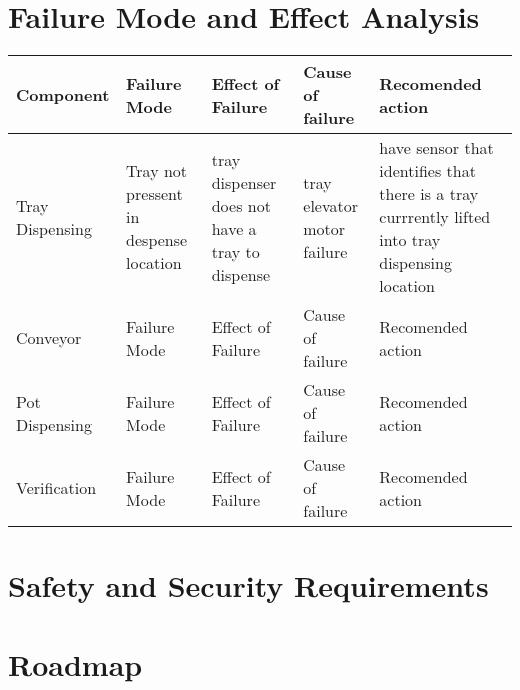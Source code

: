 \documentclass{article}
\begin{document}
\section{Failure Mode and Effect Analysis}

\begin{center}
    \begin{tabular}{ | l |  p{3cm}  p{3cm}  p{3cm}  p{3cm} |}
    \hline
    Component & Failure Mode & Effect of Failure & Cause of failure & Recomended action \\
    \hline
    Tray Dispensing & Tray not pressent in despense location & tray dispenser does not have a tray to dispense & tray elevator motor failure & have sensor that identifies that there is a tray currrently lifted into tray dispensing location \\
    \hline
    Conveyor & Failure Mode & Effect of Failure & Cause of failure & Recomended action \\
    \hline
    Pot Dispensing & Failure Mode & Effect of Failure & Cause of failure & Recomended action  \\
    \hline
    Verification & Failure Mode & Effect of Failure & Cause of failure & Recomended action  \\
    \hline
    \end{tabular}
\end{center}


\section{Safety and Security Requirements}


\section{Roadmap}

\end{document}
